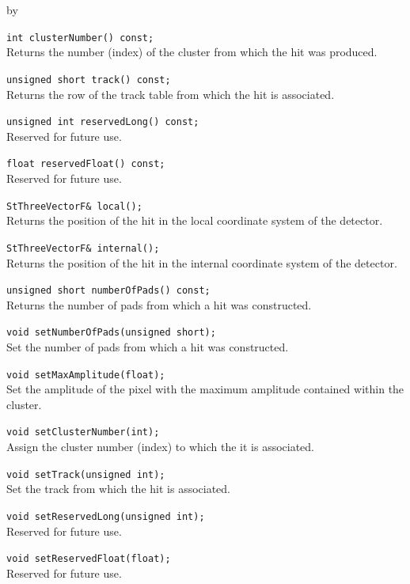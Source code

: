 \documentclass[twoside]{article}
\newcommand{\entrylabel}[1]{\mbox{\textbf{{#1}}}\hfil}%
\newenvironment{entry}
{\begin{list}{}%
    {\renewcommand{\makelabel}{\entrylabel}%
     \setlength{\labelwidth}{90pt}%
     \setlength{\leftmargin}{\labelwidth}
     \advance\leftmargin by \labelsep%
      }%
    }%
  {\end{list}}
\newcommand{\Entrylabel}[1]%
{\raisebox{0pt}[1ex][0pt]{\makebox[\labelwidth][l]%
    {\parbox[t]{\labelwidth}{\hspace{0pt}\textbf{{#1}}}}}}
\newenvironment{Entry}%
{\renewcommand{\entrylabel}{\Entrylabel}\begin{entry}}%
  {\end{entry}}
\begin{document}
\begin{Entry}
    \verb+int clusterNumber() const;+\\
    Returns the number (index) of the cluster from which the
    hit was produced.

    \verb+unsigned short track() const;+\\
    Returns the row of the track table from which the hit is
    associated.

    \verb+unsigned int reservedLong() const;+\\
    Reserved for future use.

    \verb+float reservedFloat() const;+\\
    Reserved for future use.

    \verb+StThreeVectorF& local();+\\
    Returns the position of the hit in the local coordinate
    system of the detector.

    \verb+StThreeVectorF& internal();+\\
    Returns the position of the hit in the internal coordinate
    system of the detector.

    \verb+unsigned short numberOfPads() const;+\\
    Returns the number of pads from which a hit was
    constructed.
    
    \verb+void setNumberOfPads(unsigned short);+\\
    Set the number of pads from which a hit was
    constructed.
    
    \verb+void setMaxAmplitude(float);+\\
    Set the amplitude of the pixel with the maximum
    amplitude contained within the cluster.

    \verb+void setClusterNumber(int);+\\
    Assign the cluster number (index) to which the
    it is associated.

    \verb+void setTrack(unsigned int);+\\
    Set the track from which the hit is associated.

    \verb+void setReservedLong(unsigned int);+\\
    Reserved for future use.

    \verb+void setReservedFloat(float);+\\
    Reserved for future use.
\end{Entry}
\clearpage
\end{document}
